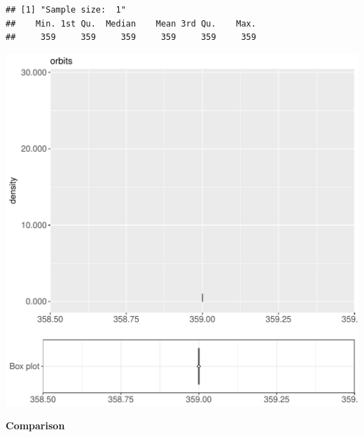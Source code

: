\documentclass{article}\usepackage[]{graphicx}\usepackage[]{color}
\makeatletter
\def\maxwidth{ %
  \ifdim\Gin@nat@width>\linewidth
    \linewidth
  \else
    \Gin@nat@width
  \fi
}
\newenvironment{kframe}{%
 \def\at@end@of@kframe{}%
 \ifinner\ifhmode%
  \def\at@end@of@kframe{\end{minipage}}%
  \begin{minipage}{\columnwidth}%
 \fi\fi%
 \def\FrameCommand##1{\hskip\@totalleftmargin \hskip-\fboxsep
 \colorbox{shadecolor}{##1}\hskip-\fboxsep
     \hskip-\linewidth \hskip-\@totalleftmargin \hskip\columnwidth}%
 \MakeFramed {\advance\hsize-\width
   \@totalleftmargin\z@ \linewidth\hsize
   \@setminipage}}%
 {\par\unskip\endMakeFramed%
 \at@end@of@kframe}
\newenvironment{knitrout}{}{} %
\makeatother
\begin{document}
\begin{knitrout}
\color{fgcolor}\begin{kframe}
\begin{verbatim}
## [1] "Sample size:  1"
##    Min. 1st Qu.  Median    Mean 3rd Qu.    Max. 
##     359     359     359     359     359     359
\end{verbatim}


{\ttfamily\noindent\bfseries{}}\end{kframe}
\includegraphics[width=\maxwidth]{figure/RH4_noCache_big-1} 

\end{knitrout}
  
 \textbf{Comparison}
  
\end{document}
